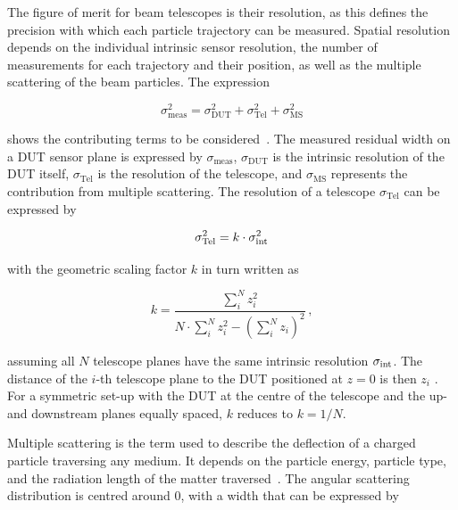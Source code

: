 The figure of merit for beam telescopes is their resolution, as this defines the precision with which each particle trajectory can be measured. 
Spatial resolution depends on the individual intrinsic sensor resolution, the number of measurements for each trajectory and their position, as well as the multiple scattering of the beam particles.
The expression

\begin{equation}
\label{eq:telescoperesolutionequation}
\sigma_{\textrm{meas}}^2 = \sigma_{\textrm{DUT}}^2 + \sigma_{\textrm{Tel}}^2 +
\sigma_{\textrm{MS}}^2
\end{equation}

\noindent shows the contributing terms to be considered~\cite{ref:eudetreport200902}. 
The measured residual width on a DUT sensor plane is expressed by $\sigma_{\textrm{meas}}$, $\sigma_{\textrm{DUT}}$ is the intrinsic resolution of the DUT itself,
 $\sigma_{\textrm{Tel}}$ is the resolution of the telescope, and $\sigma_{\textrm{MS}}$ represents the contribution from multiple scattering.
The resolution of a telescope $\sigma_{\textrm{Tel}}$ can be expressed by

\begin{equation}
\label{eq:telescopepointing}
\sigma_{\textrm{Tel}}^2 = k \cdot \sigma_{\textrm{int}}^2
\end{equation}

\noindent with the geometric scaling factor $k$ in turn written as

\begin{equation}
k = \frac{\sum_i^N z_i^2}{N \cdot \sum_i^N z_i^2 - \left( \sum_i^N z_i \right)^2} \,,
\end{equation}

\noindent assuming all $N$ telescope planes have the same intrinsic resolution $\sigma_{\textrm{int}}$. 
The distance of the $i$-th telescope plane to the DUT positioned at $z=0$ is then $z_i$ .
For a symmetric set-up with the DUT at the centre of the telescope and the up- and downstream planes equally spaced, $k$ reduces to $k = 1/N$. 

Multiple scattering is the term used to describe the deflection of a charged particle traversing any medium.
It depends on the particle energy, particle type, and the radiation length of the matter traversed~\cite{ref:scatteringhighland}.
The angular scattering distribution is centred around $0$, with a width that can be expressed by~\cite{ref:PDG-2014}

